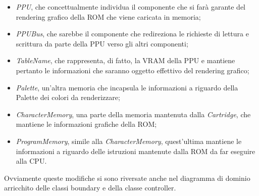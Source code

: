 \documentclass[11pt]{article}
\begin{document}
\begin{itemize}
	\item{
		\emph{PPU}, che concettualmente individua il componente che si farà garante del rendering grafico della ROM che viene caricata in memoria;
	}
	\item{
		\emph{PPUBus}, che sarebbe il componente che redireziona le richieste di lettura e scrittura da parte della PPU verso gli altri componenti;
	}
	\item{
		\emph{TableName}, che rappresenta, di fatto, la VRAM della PPU e mantiene pertanto le informazioni che saranno oggetto effettivo del rendering grafico;
	}
	\item{
		\emph{Palette}, un'altra memoria che incapsula le informazioni a riguardo della Palette dei colori da renderizzare;
	}
	\item{
		\emph{CharacterMemory}, una parte della memoria mantenuta dalla \emph{Cartridge}, che mantiene le informazioni grafiche della ROM;
	}
	\item{
		\emph{ProgramMemory}, simile alla \emph{CharacterMemory}, quest'ultima mantiene le informazioni a riguardo delle istruzioni mantenute dalla ROM da far eseguire alla CPU.
	}
\end{itemize}
Ovviamente queste modifiche si sono riversate anche nel diagramma di dominio arricchito delle classi boundary e della classe controller.
\end{document}
